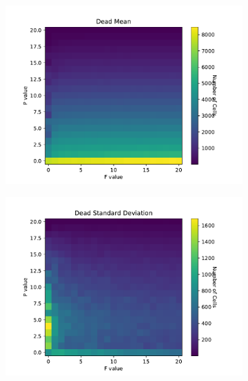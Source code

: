 \documentclass{article}
\begin{document}
\begin{figure}[H]
\centering
\begin{subfigure}{.5\textwidth}
    \centering
    \includegraphics[scale=0.4]{Dead Mean 2.pdf}
    \label{fig:livemean3D}
\end{subfigure}%
\begin{subfigure}{.5\textwidth}
    \centering
    \includegraphics[scale=0.4]{Dead STD 2.pdf}
    \label{fig:livestd}
\end{subfigure}
\end{figure}
\end{document}
